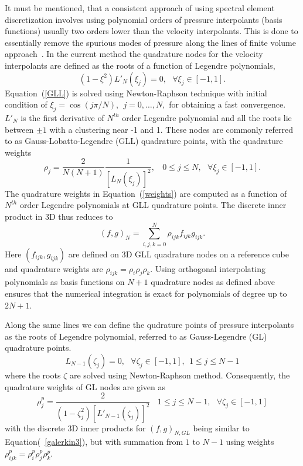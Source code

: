 \documentclass[times]{fldauth}
\begin{document}
 It must be mentioned, that a consistent approach of using spectral element discretization involves using polynomial orders of pressure interpolants (basis functions) usually two orders lower than the velocity interpolants. This is done to essentially remove the spurious modes of pressure along the lines of finite volume approach~\cite{patera2,deville}. In the current method the quadrature nodes for the velocity interpolants are defined as the roots of a function of Legendre polynomials,
\begin{equation}
(1-\xi^{2})L'_{N}(\xi_j) = 0, \ \ \ \forall \xi_j \in [-1,1]. \label{GLL}
\end{equation}
 Equation~(\ref{GLL}) is solved using Newton-Raphson technique with initial condition of $\xi_j = \cos(j\pi/N), \ \ j = 0,\ldots, N,$ for obtaining a fast convergence. $L'_{N}$ is the first derivative of $N^{th}$ order Legendre polynomial and all the roots lie between $\pm 1$ with a clustering near -1 and 1. These nodes are commonly referred to as Gauss-Lobatto-Legendre (GLL) quadrature points, with the quadrature weights
 \begin{equation}
 \rho_j = \frac{2}{N(N+1)}\frac{1}{[L_N(\xi_j)]^2}, \ \ \ \ 0 \le j\le N, \ \ \ \forall \xi_j\in [-1,1]. \label{weights}
 \end{equation}
 The quadrature weights in Equation~(\ref{weights}) are computed as a function of $N^{th}$ order Legendre polynomials at GLL quadrature points. The discrete inner product in 3D thus reduces to
\begin{equation}
(f,g)_{N} = \sum_{i,j,k=0}^{N}\rho_{ijk}f_{ijk}g_{ijk}.\label{galerkin3}
\end{equation}
Here $(f_{ijk},g_{ijk})$ are defined on 3D GLL quadrature nodes on a reference cube and quadrature weights are $\rho_{ijk} = \rho_{i}\rho_{j}\rho_{k}$. Using orthogonal interpolating polynomials as basis functions on $N+1$ quadrature nodes as defined above ensures that the numerical integration is exact for polynomials of degree up to $2N+1$.

Along the same lines we can define the qudrature points of pressure interpolants as the roots of Legendre polynomial, referred to as Gauss-Legendre (GL) quadrature points.
\begin{equation}
L_{N-1}(\zeta_j) = 0, \ \ \ \forall \zeta_j \in [-1, 1], \ \ 1\le j\le N-1 \label{GL}
\end{equation}
where the roots $\zeta$ are solved using Newton-Raphson method. Consequently, the quadrature weights of GL nodes are given as 
\begin{equation}
\rho^{p}_j = \frac{2}{(1 - \zeta_j^{2})[L'_{N-1}(\zeta_j)]^{2}} \ \ \ \ 1 \le j\le N-1, \ \ \ \forall \zeta_j\in [-1,1]
\end{equation}
with the discrete 3D inner products for $(f,g)_{N,GL}$ being similar to Equation(~\ref{galerkin3}), but with summation from $1$ to $N-1$ using weights $\rho^{p}_{ijk} = \rho^{p}_{i}\rho^{p}_{j}\rho^{p}_{k}$.\\
\end{document}
